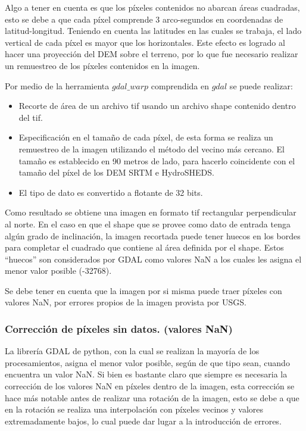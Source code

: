 \documentclass[10pt,a4paper, twoside]{report}
\begin{document}
Algo a tener en cuenta es que los píxeles contenidos no abarcan áreas cuadradas, esto se debe a que cada píxel comprende 3 arco-segundos en coordenadas de latitud-longitud. Teniendo en cuenta las latitudes en las cuales se trabaja, el lado vertical de cada píxel es mayor que los horizontales. Este efecto es logrado al hacer una proyección del DEM sobre el terreno, por lo que fue necesario realizar un remuestreo de los píxeles contenidos en la imagen.

Por medio de la herramienta $gdal\_warp$ comprendida en $gdal$ se puede realizar:

\begin{itemize}
\item Recorte de área de un archivo tif usando un archivo shape contenido dentro del tif.
\item Especificación en el tamaño de cada píxel, de esta forma se realiza un remuestreo de la imagen utilizando el método del vecino más cercano. El tamaño es establecido en 90 metros de lado, para hacerlo coincidente con el tamaño del píxel de los DEM SRTM e HydroSHEDS.
\item El tipo de dato es convertido a flotante de 32 bits.
\end{itemize}

Como resultado se obtiene una imagen en formato tif rectangular perpendicular al norte. En el caso en que el shape que se provee como dato de entrada tenga algún grado de inclinación, la imagen recortada puede tener huecos en los bordes para completar el cuadrado que contiene al área definida por el shape. Estos "`huecos"' son considerados por GDAL como valores NaN a los cuales les asigna el menor valor posible (-32768).

Se debe tener en cuenta que la imagen por si misma puede traer píxeles con valores NaN, por errores propios de la imagen provista por USGS.

\subsubsection{Corrección de píxeles sin datos. (valores NaN)}

La librería GDAL de python, con la cual se realizan la mayoría de los procesamientos, asigna el menor valor posible, según de que tipo sean, cuando encuentra un valor NaN.
Si bien es bastante claro que siempre es necesaria la corrección de los valores NaN en píxeles dentro de la imagen, esta corrección se hace más notable antes de realizar una rotación de la imagen, esto se debe a que en la rotación se realiza una interpolación con píxeles vecinos y valores extremadamente bajos, lo cual puede dar lugar a la introducción de errores.
\end{document}
